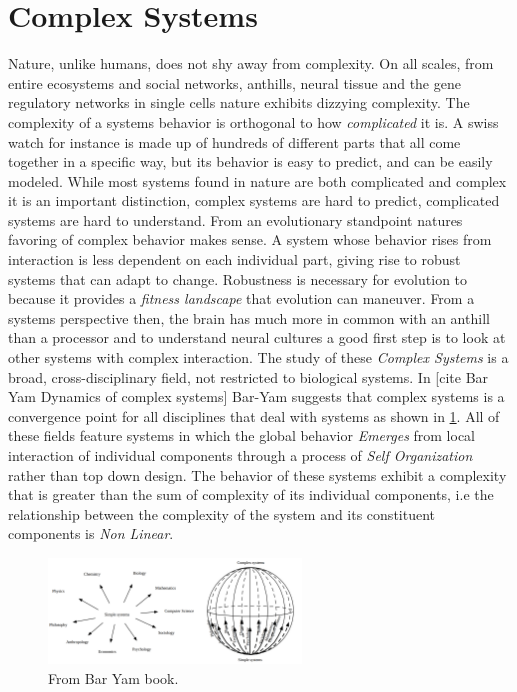 \section{Complex Systems}
%
Nature, unlike humans, does not shy away from complexity.
On all scales, from entire ecosystems and social networks, anthills, neural
tissue and the gene regulatory networks in single cells nature exhibits dizzying
complexity.
%
The complexity of a systems behavior is orthogonal to how \emph{complicated} it
is.
A swiss watch for instance is made up of hundreds of different parts that all
come together in a specific way, but its behavior is easy to predict, and can be
easily modeled.
While most systems found in nature are both complicated and complex it is an
important distinction, complex systems are hard to predict, complicated systems
are hard to understand.
%
From an evolutionary standpoint natures favoring of complex behavior makes sense.
A system whose behavior rises from interaction is less dependent on each
individual part, giving rise to robust systems that can adapt to change.
Robustness is necessary for evolution to because it provides a \emph{fitness
landscape} that evolution can maneuver.
%
From a systems perspective then, the brain has much more in common with an anthill
than a processor and to understand neural cultures a good first step is to look at
other systems with complex interaction.
The study of these \emph{Complex Systems} is a broad, cross-disciplinary field,
not restricted to biological systems.
%
In [cite Bar Yam Dynamics of complex systems] Bar-Yam suggests that complex
systems is a convergence point for all disciplines that deal with systems as
shown in \ref{figCX}.
%
All of these fields feature systems in which the global behavior \emph{Emerges}
from local interaction of individual components through a process of \emph{Self
  Organization} rather than top down design.
% 
The behavior of these systems exhibit a complexity that is greater than the
sum of complexity of its individual components, i.e the relationship between the
complexity of the system and its constituent components is \emph{Non Linear}.
%
\par
\begin{figure}[h!]
  \centering
  \includegraphics[width=0.6\textwidth]{fig/BarYamCX.png}
  \caption{From Bar Yam book.}
  \label{figCX}
\end{figure}
